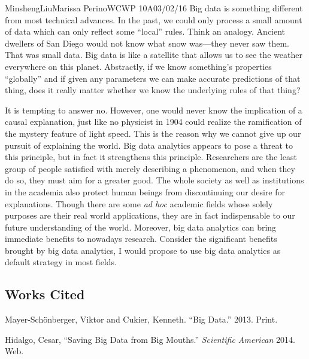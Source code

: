 \documentclass[12pt,letterpaper]{article}
\begin{document}
\begin{mla}{Minsheng}{Liu}{Marissa Perino}{WCWP 10A}{03/02/16}
Big data is something different from most technical advances. In the
past, we could only process a small amount of data which can only
reflect some ``local'' rules. Think an analogy. Ancient dwellers of San
Diego would not know what snow was---they never saw them. That was small
data. Big data is like a satellite that allows us to see the weather
everywhere on this planet. Abstractly, if we know something's properties
``globally'' and if given any parameters we can make accurate
predictions of that thing, does it really matter whether we know the
underlying rules of that thing?

It is tempting to answer no. However, one would never know the
implication of a causal explanation, just like no physicist in 1904
could realize the ramification of the mystery feature of light speed.
This is the reason why we cannot give up our pursuit of explaining the
world. Big data analytics appears to pose a threat to this principle,
but in fact it strengthens this principle. Researchers are the least
group of people satisfied with merely describing a phenomenon, and when
they do so, they must aim for a greater good. The whole society as well
as institutions in the academia also protect human beings from
discontinuing our desire for explanations. Though there are some
\emph{ad hoc} academic fields whose solely purposes are their real world
applications, they are in fact indispensable to our future understanding
of the world. Moreover, big data analytics can bring immediate benefits
to nowadays research. Consider the significant benefits brought by big
data analytics, I would propose to use big data analytics as default
strategy in most fields.

\subsection*{Works Cited}
\bibent Mayer-Schönberger, Viktor and Cukier, Kenneth. ``Big Data.'' 2013. Print.

\bibent Hidalgo, Cesar, ``Saving Big Data from Big Mouths.'' \textit{Scientific American} 2014. Web.

\end{mla}
\end{document}
